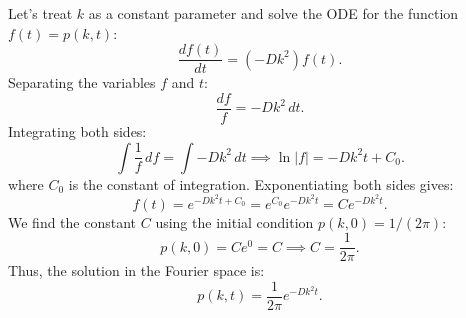 Let's treat $k$ as a constant parameter and solve the ODE for the function $f(t) = p(k,t)$:
\begin{equation}
\frac{df(t)}{dt} = (-Dk^2) f(t).
\end{equation}
Separating the variables $f$ and $t$:
\begin{equation}
\frac{df}{f} = -Dk^2 \,dt.
\end{equation}
Integrating both sides:
\begin{equation}
\int \frac{1}{f} \,df = \int -Dk^2 \,dt \implies \ln|f| = -Dk^2 t + C_0.
\end{equation}
where $C_0$ is the constant of integration. Exponentiating both sides gives:
\begin{equation}
f(t) = e^{-Dk^2 t + C_0} = e^{C_0} e^{-Dk^2 t} = C e^{-Dk^2 t}.
\end{equation}
We find the constant $C$ using the initial condition $p(k,0) = 1/(2\pi)$:
\begin{equation}
p(k,0) = C e^{0} = C \implies C = \frac{1}{2\pi}.
\end{equation}
Thus, the solution in the Fourier space is:
\begin{equation}
p(k,t) = \frac{1}{2\pi} e^{-Dk^2 t}.
\end{equation}

